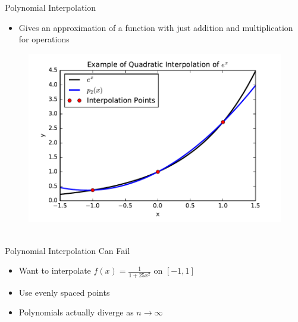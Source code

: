 \documentclass[final]{beamer}
\begin{document}
\begin{frame}[fragile]{}
\begin{columns}[t]
\begin{column}{.31\linewidth}
\begin{block}{Polynomial Interpolation}
\begin{minipage}{.55\linewidth}
\begin{itemize}
		\item Gives an approximation of a function with just addition and multiplication for operations
	\end{itemize}
	\end{minipage}%
	\hfill%
	\begin{minipage}{.4\linewidth}
	\begin{figure}
	\includegraphics[width=\textwidth]{interpolation_ex.pdf}
	\end{figure}
	\end{minipage}%
	\\
	\vspace{2mm}
{\color{numhypRed} Polynomial Interpolation Can Fail \cite[Thm.\ 6.1]{mason_2003}}\\
	\begin{minipage}{.55\linewidth}
	\vspace{-10mm}
	\begin{itemize}
		\item Want to interpolate $f(x) = \frac{1}{1+25x^2}$ on $[-1,1]$ 
		\item Use evenly spaced points
		\item Polynomials actually diverge as $n\to\infty$
	\end{itemize}
	\end{minipage}%
	\hfill%
	\begin{minipage}{.4\linewidth}
	\begin{figure}

\end{figure}
\end{minipage}
\end{block}
\end{column}
\end{columns}
\end{frame}
\end{document}
